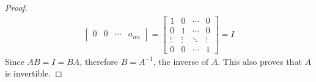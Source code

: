\documentclass{article}
\begin{document}
\begin{enumerate}
\begin{proof}
\begin{align*}
\begin{bmatrix}
                            0      & 0      & \cdots & a_{nn}
                          \end{bmatrix} = \begin{bmatrix}
                                            1      & 0      & \cdots & 0      \\
                                            0      & 1      & \cdots & 0      \\
                                            \vdots & \vdots & \ddots & \vdots \\
                                            0      & 0      & \cdots & 1
                                          \end{bmatrix} = I
    \end{align*}
    Since $AB = I = BA$, therefore $B = A^{-1}$, the inverse of $A$. This also proves that $A$ is invertible.
  \end{proof}
\end{enumerate}
\end{document}
